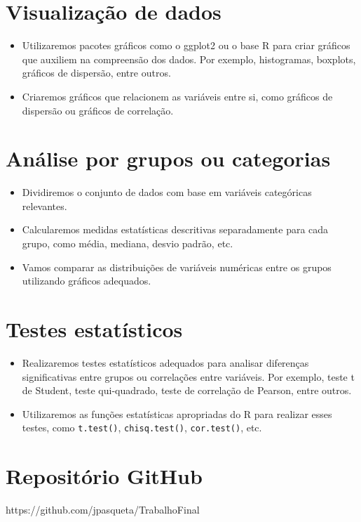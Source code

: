\documentclass[12pt, 
oneside,		  
a4paper,			
english,			
brazil				 
]{article}
\begin{document}
\section{Visualização de dados}

\begin{itemize}
\item Utilizaremos pacotes gráficos como o ggplot2 ou o base R para criar gráficos que auxiliem na compreensão dos dados. Por exemplo, histogramas, boxplots, gráficos de dispersão, entre outros.
\item Criaremos gráficos que relacionem as variáveis entre si, como gráficos de dispersão ou gráficos de correlação.
\end{itemize}

\section{Análise por grupos ou categorias}

\begin{itemize}
\item Dividiremos o conjunto de dados com base em variáveis categóricas relevantes.
\item Calcularemos medidas estatísticas descritivas separadamente para cada grupo, como média, mediana, desvio padrão, etc.
\item Vamos comparar as distribuições de variáveis numéricas entre os grupos utilizando gráficos adequados.
\end{itemize}

\section{Testes estatísticos}

\begin{itemize}
\item Realizaremos testes estatísticos adequados para analisar diferenças significativas entre grupos ou correlações entre variáveis. Por exemplo, teste t de Student, teste qui-quadrado, teste de correlação de Pearson, entre outros.
\item Utilizaremos as funções estatísticas apropriadas do R para realizar esses testes, como \texttt{t.test()}, \texttt{chisq.test()}, \texttt{cor.test()}, etc.
\end{itemize}

\section{Repositório GitHub}

https://github.com/jpasqueta/TrabalhoFinal

\justyfing
	
\end{document}
